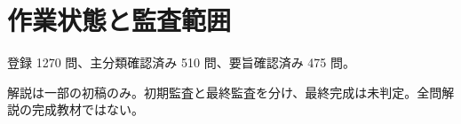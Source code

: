 \chapter{作業状態と監査範囲}
登録 1270 問、主分類確認済み 510 問、要旨確認済み 475 問。
\par 解説は一部の初稿のみ。初期監査と最終監査を分け、最終完成は未判定。全問解説の完成教材ではない。
